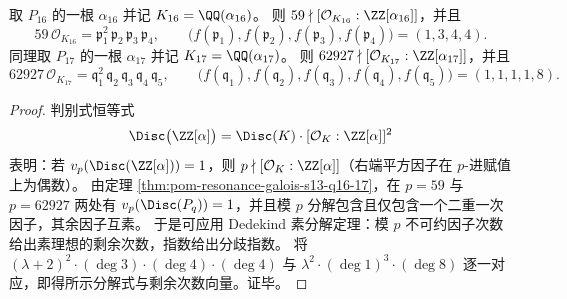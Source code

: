 \begin{proposition}[一次判别式赋值与素理想分解]\label{prop:pom-resonance-q16-q17-dedekind-factorization}
取 \(P_{16}\) 的一根 \(\alpha_{16}\) 并记 \(K_{16}=\QQ(\alpha_{16})\)。
则 \(59\nmid [\mathcal{O}_{K_{16}}:\ZZ[\alpha_{16}]]\)，并且
\[
59\,\mathcal{O}_{K_{16}}=\mathfrak p_1^{2}\,\mathfrak p_2\,\mathfrak p_3\,\mathfrak p_4,\qquad
\bigl(f(\mathfrak p_1),f(\mathfrak p_2),f(\mathfrak p_3),f(\mathfrak p_4)\bigr)=(1,3,4,4).
\]
同理取 \(P_{17}\) 的一根 \(\alpha_{17}\) 并记 \(K_{17}=\QQ(\alpha_{17})\)。
则 \(62927\nmid [\mathcal{O}_{K_{17}}:\ZZ[\alpha_{17}]]\)，并且
\[
62927\,\mathcal{O}_{K_{17}}=\mathfrak q_1^{2}\,\mathfrak q_2\,\mathfrak q_3\,\mathfrak q_4\,\mathfrak q_5,\qquad
\bigl(f(\mathfrak q_1),f(\mathfrak q_2),f(\mathfrak q_3),f(\mathfrak q_4),f(\mathfrak q_5)\bigr)=(1,1,1,1,8).
\]
\end{proposition}
\begin{proof}
判别式恒等式
\[
\Disc\bigl(\ZZ[\alpha]\bigr)=\Disc(K)\cdot[\mathcal{O}_K:\ZZ[\alpha]]^2
\]
表明：若 \(v_p(\Disc(\ZZ[\alpha]))=1\)，则 \(p\nmid[\mathcal{O}_K:\ZZ[\alpha]]\)（右端平方因子在 \(p\)-进赋值上为偶数）。
由定理 \ref{thm:pom-resonance-galois-s13-q16-17}，在 \(p=59\) 与 \(p=62927\) 两处有 \(v_p(\Disc(P_q))=1\)，并且模 \(p\) 分解包含且仅包含一个二重一次因子，其余因子互素。
于是可应用 Dedekind 素分解定理：模 \(p\) 不可约因子次数给出素理想的剩余次数，指数给出分歧指数。
将 \((\lambda+2)^2\cdot(\deg 3)\cdot(\deg 4)\cdot(\deg 4)\) 与 \(\lambda^2\cdot(\deg 1)^3\cdot(\deg 8)\) 逐一对应，即得所示分解式与剩余次数向量。证毕。
\end{proof}

